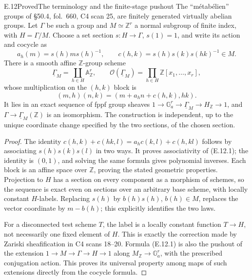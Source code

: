 \begin{statement}{E.12}{Proved}{The terminology and the finite-stage pushout}
The ``m\'etab\'elien'' groups of \S50.4, fol.~660, C4 scan 25,
are finitely generated virtually abelian groups.  Let \(\Gamma\)
be such a group and \(M\simeq\mathbb Z^r\) a normal subgroup of
finite index, with \(H=\Gamma/M\).  Choose a set section
\(s:H\to\Gamma\), \(s(1)=1\), and write its action and cocycle as
\[
 a_h(m)=s(h)ms(h)^{-1},\qquad
 c(h,k)=s(h)s(k)s(hk)^{-1}\in M.
\]
There is a smooth affine \(\mathbb Z\)-group scheme
\[
 \underline\Gamma_M=\coprod_{h\in H}\mathbb A^r_{\mathbb Z},\qquad
 \mathcal O(\underline\Gamma_M)=\prod_{h\in H}\mathbb Z[x_1,\ldots,x_r],
\]
whose multiplication on the \((h,k)\) block is
\[
               (m,h)(n,k)=(m+a_hn+c(h,k),hk).       \tag{E.12.1}
\]
It lies in an exact sequence of fppf group sheaves
\(1\to\mathbb G_a^r\to\underline\Gamma_M\to H_{\mathbb Z}\to1\),
and \(\Gamma\to\underline\Gamma_M(\mathbb Z)\) is an isomorphism.
The construction is independent, up to the unique coordinate change
specified by the two sections, of the chosen section.
\end{statement}
\begin{proof}
The identity
\(c(h,k)+c(hk,l)=a_hc(k,l)+c(h,kl)\) follows by associating
\(s(h)s(k)s(l)\) in two ways.  It proves associativity of (E.12.1);
the identity is \((0,1)\), and solving the same formula gives
polynomial inverses.  Each block is an affine space over
\(\mathbb Z\), proving the stated geometric properties.  Projection
to \(H\) has a section on every component as a morphism of schemes,
so the sequence is exact even on sections over an arbitrary base
scheme, with locally constant \(H\)-labels.  Replacing \(s(h)\) by
\(b(h)s(h)\), \(b(h)\in M\), replaces the vector coordinate by
\(m-b(h)\); this explicitly identifies the two laws.

For a disconnected test scheme \(T\), the label is a locally
constant function \(T\to H\), not necessarily one fixed element
of \(H\).  This is exactly the correction made by Zariski
sheafification in C4 scans 18--20.  Formula (E.12.1) is also the
pushout of the extension \(1\to M\to\Gamma\to H\to1\) along
\(M_{\mathbb Z}\to\mathbb G_a^r\), with the prescribed conjugation
action.  This proves its universal property among maps of such
extensions directly from the cocycle formula.
\end{proof}

